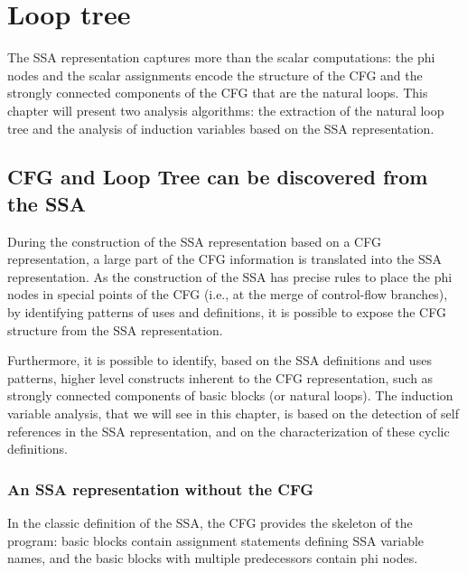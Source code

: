 \chapter{Loop tree }

\providecommand{\SSA}{SSA}
\providecommand{\CFG}{CFG}
\providecommand{\loopphi}{loop-$\phi$}
\providecommand{\closephi}{close-$\phi$}
\providecommand{\CHREC}[1]{\{#1\}}

The \SSA{} representation captures more than the scalar computations: the
phi nodes and the scalar assignments encode the structure of the CFG
and the strongly connected components of the CFG that are the natural
loops.  This chapter will present two analysis algorithms: the
extraction of the natural loop tree and the analysis of induction
variables based on the \SSA{} representation.

\section{\CFG{} and Loop Tree can be discovered from the \SSA{}}

During the construction of the \SSA{} representation based on a \CFG{}
representation, a large part of the \CFG{} information is translated
into the \SSA{} representation.  As the construction of the \SSA{} has
precise rules to place the phi nodes in special points of the \CFG{}
(i.e., at the merge of control-flow branches), by identifying patterns
of uses and definitions, it is possible to expose the \CFG{} structure
from the \SSA{} representation.

Furthermore, it is possible to identify, based on the \SSA{}
definitions and uses patterns, higher level constructs inherent to the
\CFG{} representation, such as strongly connected components of basic
blocks (or natural loops).  The induction variable analysis, that we
will see in this chapter, is based on the detection of self references
in the \SSA{} representation, and on the characterization of these
cyclic definitions.

\subsection{An \SSA{} representation without the \CFG{}}

In the classic definition of the \SSA{}, the \CFG{} provides the
skeleton of the program: basic blocks contain assignment statements
defining \SSA{} variable names, and the basic blocks with multiple
predecessors contain phi nodes.

